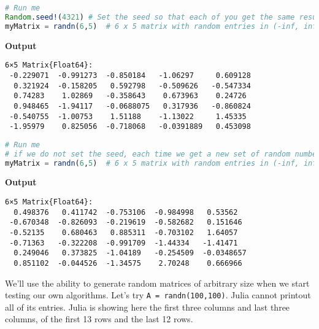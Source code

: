 \begin{lstlisting}[language=Julia,style=mystyle]
# Run me
Random.seed!(4321) # Set the seed so that each of you get the same results. 
myMatrix = randn(6,5)  # 6 x 5 matrix with random entries in (-inf, inf)
\end{lstlisting}
\textbf{Output} 
\begin{verbatim}
6×5 Matrix{Float64}:
 -0.229071  -0.991273  -0.850184   -1.06297     0.609128
  0.321924  -0.158205   0.592798   -0.509626   -0.547334
  0.74283    1.02869   -0.358643    0.673963    0.24726
  0.948465  -1.94117   -0.0688075   0.317936   -0.860824
 -0.540755  -1.00753    1.51188    -1.13022     1.45335
 -1.95979    0.825056  -0.718068   -0.0391889   0.453098
\end{verbatim}

\begin{lstlisting}[language=Julia,style=mystyle]
# Run me
# if we do not set the seed, each time we get a new set of random numbers. 
myMatrix = randn(6,5)  # 6 x 5 matrix with random entries in (-inf, inf)
\end{lstlisting}
\textbf{Output} 
\begin{verbatim}
6×5 Matrix{Float64}:
  0.498376   0.411742  -0.753106  -0.984998   0.53562
 -0.670348  -0.826093  -0.219619  -0.582682   0.151646
 -0.52135    0.680463   0.885311  -0.703102   1.64057
 -0.71363   -0.322208  -0.991709  -1.44334   -1.41471
  0.249046   0.373825  -1.04189   -0.254509  -0.0348657
  0.851102  -0.044526  -1.34575    2.70248    0.666966
\end{verbatim}



We'll use the ability to generate random matrices of arbitrary size when we start testing our own algorithms. Let's try \texttt{A = randn(100,100)}. Julia cannot printout all of its entries. Julia is showing here the first three columns and last three columns, of the first 13 rows and the last 12 rows. 




